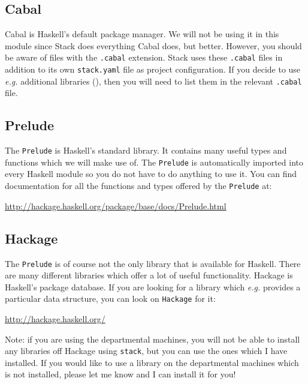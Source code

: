 \subsection{Cabal}

Cabal is Haskell's default package manager. We will not be using it in this module since Stack does everything Cabal does, but better. However, you should be aware of files with the \texttt{\small .cabal} extension. Stack uses these \texttt{\small .cabal} files in addition to its own \texttt{\small stack.yaml} file as project configuration. If you decide to use \emph{e.g.} additional libraries (), then you will need to list them in the relevant \texttt{\small .cabal} file.

\subsection{Prelude} 

The \texttt{\small Prelude} is Haskell's standard library. It contains many useful types and functions which we will make use of. The \texttt{\small Prelude} is automatically imported into every Haskell module so you do not have to do anything to use it. You can find documentation for all the functions and types offered by the \texttt{\small Prelude} at:
\begin{center}
\url{http://hackage.haskell.org/package/base/docs/Prelude.html}
\end{center}

\subsection{Hackage} 
\label{sec:hackage}

The \texttt{\small Prelude} is of course not the only library that is available for Haskell. There are many different libraries which offer a lot of useful functionality. Hackage is Haskell's package database. If you are looking for a library which \emph{e.g.} provides a particular data structure, you can look on \texttt{\small Hackage} for it:
\begin{center}
\url{http://hackage.haskell.org/}
\end{center}
Note: if you are using the departmental machines, you will not be able to install any libraries off Hackage using \texttt{\small stack}, but you can use the ones which I have installed. If you would like to use a library on the departmental machines which is not installed, please let me know and I can install it for you!

